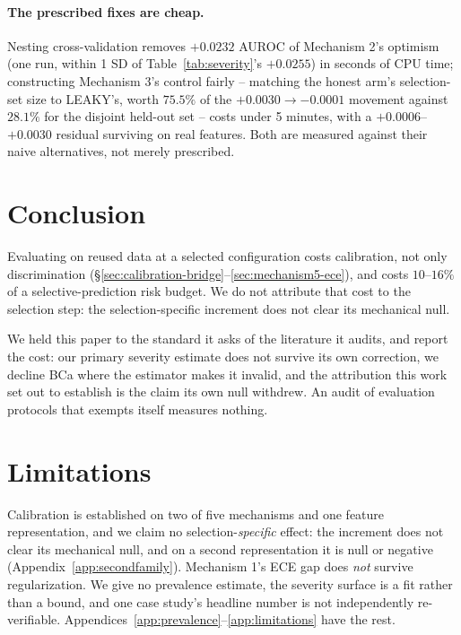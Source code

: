 \documentclass{article}
\begin{document}
\paragraph{The prescribed fixes are cheap.} Nesting cross-validation removes
$+0.0232$ AUROC of Mechanism 2's optimism (one run, within 1 SD of
Table~\ref{tab:severity}'s $+0.0255$) in seconds of CPU time; constructing
Mechanism 3's control fairly -- matching the honest arm's selection-set size to
LEAKY's, worth $75.5\%$ of the $+0.0030\to-0.0001$ movement against $28.1\%$
for the disjoint held-out set -- costs under 5 minutes, with a
$+0.0006$--$+0.0030$ residual surviving on real features. Both are measured
against their naive alternatives, not merely prescribed.

\section{Conclusion}

Evaluating on reused data at a selected configuration costs calibration, not
only discrimination (\S\ref{sec:calibration-bridge}--\ref{sec:mechanism5-ece}),
and costs $10$--$16\%$ of a selective-prediction risk budget. We do not
attribute that cost to the selection step: the selection-specific increment
does not clear its mechanical null.

We held this paper to the standard it asks of the literature it audits, and
report the cost: our primary severity estimate does not survive its own
correction, we decline BCa where the estimator makes it invalid, and the
attribution this work set out to establish is the claim its own null withdrew.
An audit of evaluation protocols that exempts itself measures nothing.

\section*{Limitations}

Calibration is established on two of five mechanisms and one feature
representation, and we claim no selection-\emph{specific} effect: the increment
does not clear its mechanical null, and on a second representation it is null
or negative (Appendix~\ref{app:secondfamily}). Mechanism 1's ECE gap does
\emph{not} survive regularization. We give no prevalence estimate, the severity
surface is a fit rather than a bound, and one case study's headline number is
not independently re-verifiable.
Appendices~\ref{app:prevalence}--\ref{app:limitations} have the rest.
\end{document}
